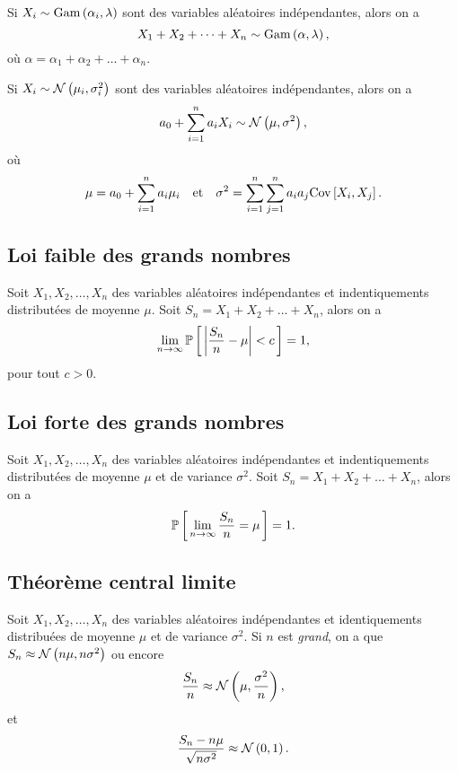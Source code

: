 \documentclass[11pt]{article}
\renewcommand\P[1]{%
	\ensuremath{%
		\mathbb{P}\left[\,#1\,\right]%
	}%
}%
\newcommand\Gam[2]{%
	\ensuremath{%
		\mathrm{Gam}\left(#1,#2\right)%
	}%
}%
\newcommand\Norm[2]{%
	\ensuremath{%
		\mathcal{N}\left(#1,#2\right)%
	}%
}%
\newcommand\Cov[2]{%
	\ensuremath{%
		\mathrm{Cov}\left[#1,#2\right]%
	}%
}%
\begin{document}
\begin{exemple}
	Si $X_i\sim\Gam{\alpha_i}{\lambda}$ sont des variables aléatoires
	indépendantes, alors on a
	\begin{equation*}
		X_1+X_2+\dots+X_n\sim\Gam{\alpha}{\lambda},
	\end{equation*}
	où $\alpha=\alpha_1+\alpha_2+\dots+\alpha_n$.
\end{exemple}

\begin{exemple}
	Si $X_i\sim\Norm{\mu_i}{\sigma_i^2}$ sont des variables aléatoires
	indépendantes, alors on a
	\begin{equation*}
		a_0+\sum_{i=1}^na_iX_i\sim\Norm{\mu}{\sigma^2},
	\end{equation*}
	où
	\begin{equation*}
		\mu=a_0+\sum_{i=1}^na_i\mu_i
		\quad\text{et}\quad
		\sigma^2=\sum_{i=1}^n\sum_{j=1}^na_ia_j\Cov{X_i}{X_j}.
	\end{equation*}
\end{exemple}

\subsection{Loi faible des grands nombres}
Soit $X_1,X_2,\dots,X_n$ des variables aléatoires indépendantes et
indentiquements distributées de moyenne $\mu$. Soit $S_n=X_1+X_2+\dots+X_n$,
alors on a
\begin{equation*}
	\lim_{n\rightarrow\infty}\P{\left\rvert
		\frac{S_n}{n}-\mu
	\right\rvert<c}=1,
\end{equation*}
pour tout $c>0$.

\subsection{Loi forte des grands nombres}
Soit $X_1,X_2,\dots,X_n$ des variables aléatoires indépendantes et
indentiquements distributées de moyenne $\mu$ et de variance $\sigma^2$. Soit
$S_n=X_1+X_2+\dots+X_n$, alors on a
\begin{equation*}
	\P{\lim_{n\rightarrow\infty}\frac{S_n}{n}=\mu}=1.
\end{equation*}

\subsection{Théorème central limite}
Soit $X_1,X_2,\dots,X_n$ des variables aléatoires indépendantes et
identiquements distribuées de moyenne $\mu$ et de variance $\sigma^2$. Si $n$
est \textit{grand}, on a que $S_n\approx\Norm{n\mu}{n\sigma^2}$ ou encore
\begin{equation*}
	\frac{S_n}{n}\approx\Norm{\mu}{\frac{\sigma^2}{n}},
\end{equation*}
et
\begin{equation*}
	\frac{S_n-n\mu}{\sqrt{n\sigma^2}}\approx\Norm{0}{1}.
\end{equation*}
\end{document}
